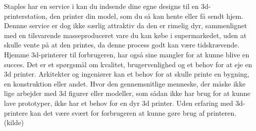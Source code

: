 Staples har en service i kan du indsende dine egne designs til en 3d-printerstation, den printer din model, som du så kan hente eller få sendt hjem. Dennne service er dog ikke særlig attraktiv da den er rimelig dyr, sammenlignet med en tilsvarende masseproduceret vare du kan købe i supermarkedet, uden at skulle vente på at den printes, da denne process godt kan være tidskrævende.
Hjemme 3d-printerer til forbrugeren, har også sine mangler for at kunne blive en succes. Det er et spørgsmål om kvalitet, brugervenlighed og et behov for at eje en 3d printer. Arkitekter og ingeniører kan et behov for at skulle printe en bygning, en konstruktion eller andet. Hvor den gennemsnitlige menneske, der måske ikke lige arbejder med 3d figurer eller modeller, som sådan ikke har brug for at kunne lave prototyper, ikke har et behov for en dyr 3d printer. Uden erfaring med 3d-printere kan det være svært for forbrugeren at kunne gøre brug af printeren. (kilde)
